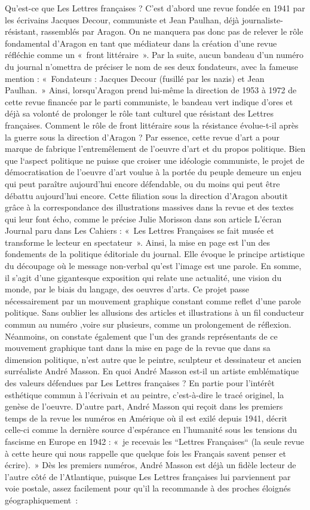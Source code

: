 Qu’est-ce que Les Lettres françaises ? C’est d’abord une revue fondée en 1941 par les écrivains Jacques Decour, communiste et Jean  Paulhan, déjà journaliste-résistant, rassemblés par Aragon. On ne manquera pas donc pas de relever le rôle fondamental d’Aragon en tant que médiateur dans la création d’une revue réfléchie comme un « front littéraire ».  Par la suite, aucun bandeau d’un numéro du journal n’omettra de préciser le nom de ses deux fondateurs, avec la fameuse mention : « Fondateurs : Jacques Decour  (fusillé par les nazis) et Jean Paulhan. » Ainsi, lorsqu’Aragon prend lui-même la direction de 1953 à 1972 de cette revue financée par le parti communiste, le bandeau vert indique d’ores et déjà sa volonté de prolonger le rôle tant culturel que résistant des Lettres françaises. Comment le rôle de front littéraire sous la résistance évolue-t-il après la guerre sous la direction d’Aragon ? Par essence, cette revue d’art a pour marque de fabrique l’entremêlement de l’oeuvre d’art et du propos politique. Bien que l‘aspect politique ne puisse que croiser une idéologie communiste, le projet de démocratisation de l’oeuvre d’art voulue à la portée du peuple demeure un enjeu qui peut paraître aujourd’hui encore défendable, ou du moins qui peut être débattu aujourd’hui encore. Cette filiation  sous la direction d’Aragon aboutit grâce à la correspondance des illustrations massives dans la revue et des textes qui leur font écho, comme le précise Julie Morisson dans son article L’écran Journal paru dans Les Cahiers : « Les Lettres Françaises se fait musée et transforme le lecteur en spectateur ». Ainsi, la mise en page est l’un des fondements de la politique éditoriale du journal. Elle évoque le principe artistique du découpage où le message non-verbal qu’est l’image est une parole. En somme, il s’agit  d’une gigantesque exposition qui relate une actualité, une vision du monde, par le biais du langage, des oeuvres d’arts. 
Ce projet passe nécessairement par un mouvement graphique constant comme reflet d’une parole politique. Sans oublier les allusions des articles et illustrations à un fil conducteur commun au numéro ,voire sur plusieurs, comme un prolongement de réflexion. Néanmoins, on constate également que l’un des grands représentants de ce mouvement graphique tant dans la mise en page de la revue que dans sa dimension politique, n’est autre que le peintre, sculpteur et dessinateur et ancien surréaliste André Masson. En quoi André Masson est-il un artiste emblématique des valeurs défendues par Les Lettres françaises ? En partie pour l’intérêt esthétique commun à l’écrivain et au peintre, c’est-à-dire le tracé originel, la genèse de l’oeuvre. D’autre part, André Masson qui reçoit dans les premiers temps de la revue les numéros en Amérique où il est exilé depuis 1941, décrit celle-ci comme la dernière source d’espérance en l’humanité sous les tensions du fascisme en Europe en 1942 : « je recevais les “Lettres Françaises“ (la seule revue à cette heure qui nous rappelle que quelque fois les Français savent penser et écrire). » Dès les premiers numéros, André Masson est déjà un fidèle lecteur de l’autre côté de l’Atlantique, puisque Les Lettres françaises lui parviennent par voie postale, assez facilement pour qu’il la recommande à des proches éloignés géographiquement : 
